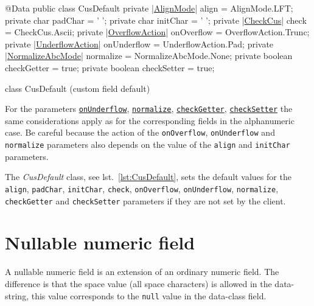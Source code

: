 \begin{elisting}[!htb]
\begin{javacode}
@Data
public class CusDefault {
    private |\hyperref[lst:AlignMode]{AlignMode}| align = AlignMode.LFT;
    private char padChar = ' ';
    private char initChar = ' ';
    private |\hyperref[lst:CheckCus]{CheckCus}| check = CheckCus.Ascii;
    private |\hyperref[lst:OverflowAction]{OverflowAction}| onOverflow = OverflowAction.Trunc;
    private |\hyperref[lst:UnderflowAction]{UnderflowAction}| onUnderflow = UnderflowAction.Pad;
    private |\hyperref[lst:NormalizeAbcMode]{NormalizeAbcMode}| normalize = NormalizeAbcMode.None;
    private boolean checkGetter = true;
    private boolean checkSetter = true;
}
\end{javacode}
\caption{class CusDefault (custom field default)}
\label{lst:CusDefault}
\end{elisting}

For the parameters 
\hyperlink{abc:unf}{\texttt{onUnderflow}}, 
\hyperlink{abc:nrm}{\texttt{normalize}},
\hyperlink{abc:get}{\texttt{checkGetter}},
\hyperlink{abc:get}{\texttt{checkSetter}}
the same considerations apply as for the corresponding fields in the 
alphanumeric case. Be careful because the action of the \verb!onOverflow!, 
\verb!onUnderflow! and \verb!normalize! parameters also depends on the value of 
the \verb!align! and \verb!initChar! parameters.

The \textsl{CusDefault} class, see lst.~\ref{lst:CusDefault}, sets the default 
values for the \verb!align!, \verb!padChar!, \verb!initChar!, 
\verb!check!, \texttt{onOver\-flow}, \verb!onUnderflow!, \verb!normalize!, 
\verb!checkGetter! and \verb!checkSetter! parameters if they are not set by the 
client.

\section{Nullable numeric field}
A nullable numeric field is an extension of an ordinary numeric field. 
The difference is that the space value (all space characters) is allowed in the 
data-string, this value corresponds to the \verb!null! value in the data-class 
field.

